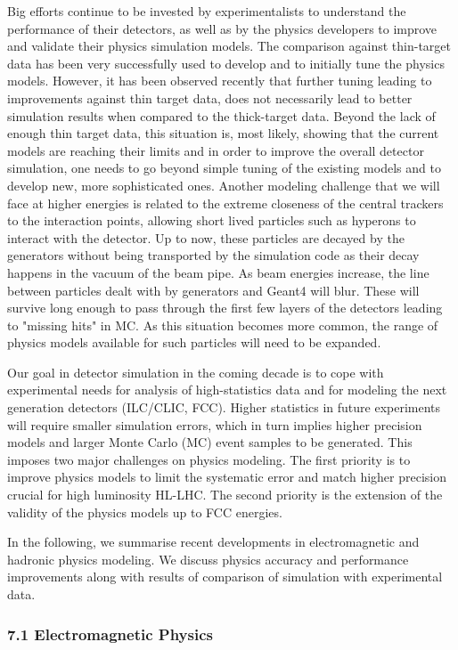 \documentclass[12pt,a4paper]{article}
\begin{document}
Big efforts continue to be invested by experimentalists to understand
the performance of their detectors, as well as by the physics developers
to improve and validate their physics simulation models. The comparison
against thin-target data has been very successfully used to develop and
to initially tune the physics models. However, it has been observed
recently that further tuning leading to improvements against thin target
data, does not necessarily lead to better simulation results when
compared to the thick-target data. Beyond the lack of enough thin target
data, this situation is, most likely, showing that the current models
are reaching their limits and in order to improve the overall detector
simulation, one needs to go beyond simple tuning of the existing models
and to develop new, more sophisticated ones. Another modeling challenge
that we will face at higher energies is related to the extreme closeness
of the central trackers to the interaction points, allowing short lived
particles such as hyperons to interact with the detector. Up to now,
these particles are decayed by the generators without being transported
by the simulation code as their decay happens in the vacuum of the beam
pipe. As beam energies increase, the line between particles dealt with
by generators and Geant4 will blur. These will survive long enough to
pass through the first few layers of the detectors leading to "missing
hits" in MC. As this situation becomes more common, the range of physics
models available for such particles will need to be expanded.

Our goal in detector simulation in the coming decade is to cope with
experimental needs for analysis of high-statistics data and for modeling
the next generation detectors (ILC/CLIC, FCC). Higher statistics in
future experiments will require smaller simulation errors, which in turn
implies higher precision models and larger Monte Carlo (MC) event
samples to be generated. This imposes two major challenges on physics
modeling. The first priority is to improve physics models to limit the
systematic error and match higher precision crucial for high luminosity
HL-LHC. The second priority is the extension of the validity of the
physics models up to FCC energies.

In the following, we summarise recent developments in electromagnetic
and hadronic physics modeling. We discuss physics accuracy and
performance improvements along with results of comparison of simulation
with experimental data.

\hypertarget{electromagnetic-physics}{%
\subsubsection{7.1 Electromagnetic
Physics}\label{electromagnetic-physics}}
\end{document}
